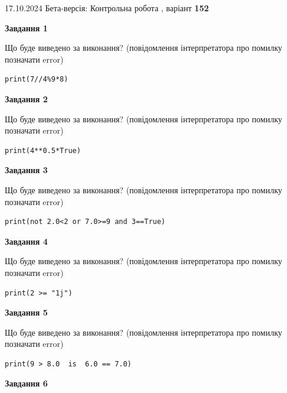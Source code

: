 \documentclass[12pt, ukrainian]{article}
\begin{document}
{\Large{17.10.2024 Бета-версія: Контрольна робота , варіант  \No \textbf { 152 }\par}}
{
\begin {large}
{\begin {center}\textbf{Завдання 1}\end {center}}

Що буде виведено за виконання? (повідомлення інтерпретатора про помилку позначати error)\par
\begin{verbatim}
print(7//4%9*8)
\end{verbatim}

{\begin {center}\textbf{Завдання 2}\end {center}}

Що буде виведено за виконання? (повідомлення інтерпретатора про помилку позначати error)\par
\begin{verbatim}
print(4**0.5*True)
\end{verbatim}

{\begin {center}\textbf{Завдання 3}\end {center}}

Що буде виведено за виконання? (повідомлення інтерпретатора про помилку позначати error)\par
\begin{verbatim}
print(not 2.0<2 or 7.0>=9 and 3==True)
\end{verbatim}

{\begin {center}\textbf{Завдання 4}\end {center}}

Що буде виведено за виконання? (повідомлення інтерпретатора про помилку позначати error)\par
\begin{verbatim}
print(2 >= "1j")
\end{verbatim}

{\begin {center}\textbf{Завдання 5}\end {center}}

Що буде виведено за виконання? (повідомлення інтерпретатора про помилку позначати error)\par
\begin{verbatim}
print(9 > 8.0  is  6.0 == 7.0)
\end{verbatim}

{\begin {center}\textbf{Завдання 6}\end {center}}


\end{large}}
\end{document}
